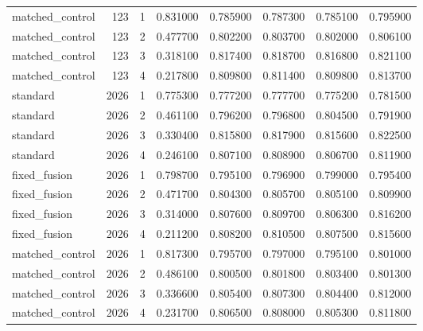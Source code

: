\begin{tabular}{lrrrrrrr}
matched\_control & 123 & 1 & 0.831000 & 0.785900 & 0.787300 & 0.785100 & 0.795900 \\
matched\_control & 123 & 2 & 0.477700 & 0.802200 & 0.803700 & 0.802000 & 0.806100 \\
matched\_control & 123 & 3 & 0.318100 & 0.817400 & 0.818700 & 0.816800 & 0.821100 \\
matched\_control & 123 & 4 & 0.217800 & 0.809800 & 0.811400 & 0.809800 & 0.813700 \\
standard & 2026 & 1 & 0.775300 & 0.777200 & 0.777700 & 0.775200 & 0.781500 \\
standard & 2026 & 2 & 0.461100 & 0.796200 & 0.796800 & 0.804500 & 0.791900 \\
standard & 2026 & 3 & 0.330400 & 0.815800 & 0.817900 & 0.815600 & 0.822500 \\
standard & 2026 & 4 & 0.246100 & 0.807100 & 0.808900 & 0.806700 & 0.811900 \\
fixed\_fusion & 2026 & 1 & 0.798700 & 0.795100 & 0.796900 & 0.799000 & 0.795400 \\
fixed\_fusion & 2026 & 2 & 0.471700 & 0.804300 & 0.805700 & 0.805100 & 0.809900 \\
fixed\_fusion & 2026 & 3 & 0.314000 & 0.807600 & 0.809700 & 0.806300 & 0.816200 \\
fixed\_fusion & 2026 & 4 & 0.211200 & 0.808200 & 0.810500 & 0.807500 & 0.815600 \\
matched\_control & 2026 & 1 & 0.817300 & 0.795700 & 0.797000 & 0.795100 & 0.801000 \\
matched\_control & 2026 & 2 & 0.486100 & 0.800500 & 0.801800 & 0.803400 & 0.801300 \\
matched\_control & 2026 & 3 & 0.336600 & 0.805400 & 0.807300 & 0.804400 & 0.812000 \\
matched\_control & 2026 & 4 & 0.231700 & 0.806500 & 0.808000 & 0.805300 & 0.811800 \\
\bottomrule
\end{tabular}
